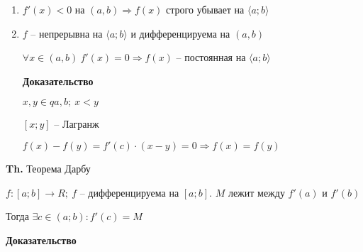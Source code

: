 \documentclass[14pt, letter paper]{article}
\newcommand{\q}[1]{\langle #1 \rangle}
\begin{document}
\begin{enumerate}
    \item $f'(x) < 0$ на $(a, b) \Rightarrow f(x)$ строго убывает на $\q{a; b}$
    
    \item $f$ -- непрерывна на $\q{a; b}$ и дифференцируема на $(a, b)$
    
    $\forall x \in (a, b)\ f'(x) = 0 \Rightarrow f(x)$ -- постоянная на $\q{a; b}$

    \begin{center}
        \textbf{Доказательство}
    \end{center}

    $x, y \in q{a, b};\ x < y$

    $[x; y]$ -- Лагранж

    $f(x) - f(y) = f'(c) \cdot (x - y) = 0 \Rightarrow f(x) = f(y)$
\end{enumerate}

\vspace{5mm}

\textbf{Th.} Теорема Дарбу

$f : [a; b] \rightarrow R;\ f$ -- дифференцируема на $[a; b]$. $M$ лежит между $f'(a)$ и $f'(b)$

Тогда $\exists c \in (a; b) : f'(c) = M$

\begin{center}
    \textbf{Доказательство}
\end{center}
\end{document}
